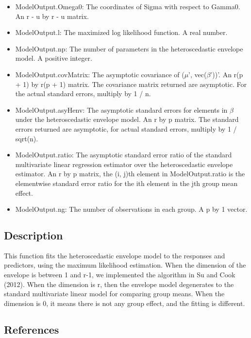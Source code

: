 \documentclass[a4paper,11pt,openany]{memoir}
\begin{document}
\begin{itemize}
   \item ModelOutput.Omega0: The coordinates of Sigma with respect to Gamma0. An r - u by r - u matrix.
   \item ModelOutput.l: The maximized log likelihood function.  A real number.
   \item ModelOutput.np: The number of parameters in the heteroscedastic envelope model.  A positive integer.
   \item ModelOutput.covMatrix: The asymptotic covariance of ($\mu$', vec($\beta$'))'.  An r(p + 1) by r(p + 1) matrix.  The covariance matrix returned are asymptotic.  For the actual standard errors, multiply by 1 / n.
   \item ModelOutput.asyHenv: The asymptotic standard errors for elements in $\beta$ under the heteroscedastic envelope model. An r by p matrix.  The standard errors returned are asymptotic, for actual standard errors, multiply by 1 / sqrt(n).
   \item ModelOutput.ratio: The asymptotic standard error ratio of the standard multivariate linear regression estimator over the heteroscedastic envelope estimator. An r by p matrix, the (i, j)th element in ModelOutput.ratio is the elementwise standard error ratio for the ith element in the jth group mean effect.
   \item ModelOutput.ng: The number of observations in each group.  A p by 1 vector.
\end{itemize}


\subsection*{Description}

\begin{par}
This function fits the heteroscedastic envelope model to the responses and predictors, using the maximum likelihood estimation.  When the dimension of the envelope is between 1 and r-1, we implemented the algorithm in Su and Cook (2012). When the dimension is r, then the envelope model degenerates to the standard multivariate linear model for comparing group means.  When the dimension is 0, it means there is not any group effect, and the fitting is different.
\end{par} \vspace{1em}


\subsection*{References}
\end{document}
